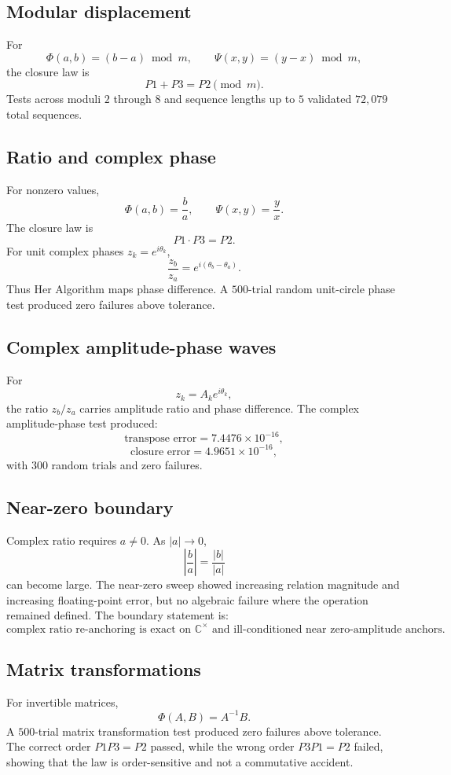 \documentclass[11pt]{article}
\newcommand{\HA}{Her Algorithm}
\newcommand{\PhiR}{\Phi}
\newcommand{\PsiI}{\Psi}
\begin{document}
\subsection{Modular displacement}
For
\[
\PhiR(a,b)=(b-a)\bmod m,\qquad \PsiI(x,y)=(y-x)\bmod m,
\]
the closure law is
\[
P1+P3=P2\pmod m.
\]
Tests across moduli \(2\) through \(8\) and sequence lengths up to \(5\) validated \(72{,}079\) total sequences.

\subsection{Ratio and complex phase}
For nonzero values,
\[
\PhiR(a,b)=\frac{b}{a},\qquad \PsiI(x,y)=\frac{y}{x}.
\]
The closure law is
\[
P1\cdot P3=P2.
\]
For unit complex phases \(z_k=e^{i\theta_k}\),
\[
\frac{z_b}{z_a}=e^{i(\theta_b-\theta_a)}.
\]
Thus \HA{} maps phase difference. A \(500\)-trial random unit-circle phase test produced zero failures above tolerance.

\subsection{Complex amplitude-phase waves}
For
\[
z_k=A_ke^{i\theta_k},
\]
the ratio \(z_b/z_a\) carries amplitude ratio and phase difference. The complex amplitude-phase test produced:
\[
\text{transpose error}=7.4476\times 10^{-16},
\]
\[
\text{closure error}=4.9651\times 10^{-16},
\]
with \(300\) random trials and zero failures.

\subsection{Near-zero boundary}
Complex ratio requires \(a\ne0\). As \(|a|\to0\),
\[
\left|\frac{b}{a}\right|=\frac{|b|}{|a|}
\]
can become large. The near-zero sweep showed increasing relation magnitude and increasing floating-point error, but no algebraic failure where the operation remained defined. The boundary statement is:
\[
\boxed{\text{complex ratio re-anchoring is exact on }\mathbb{C}^{\times}\text{ and ill-conditioned near zero-amplitude anchors.}}
\]

\subsection{Matrix transformations}
For invertible matrices,
\[
\PhiR(A,B)=A^{-1}B.
\]
A \(500\)-trial matrix transformation test produced zero failures above tolerance. The correct order \(P1P3=P2\) passed, while the wrong order \(P3P1=P2\) failed, showing that the law is order-sensitive and not a commutative accident.
\end{document}
